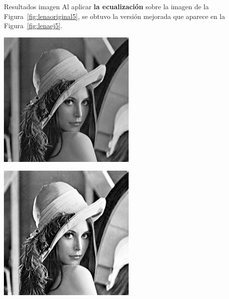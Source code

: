 \documentclass{beamer}
\begin{document}
\begin{frame}[fragile]{Resultados imagen}
	\justifying
	Al aplicar \textcolor{unahurverde}{\textbf{la ecualización}} sobre la imagen de la Figura~\ref{fig:lenaoriginal5}, 
	se obtuvo la versión mejorada que aparece en la Figura~\ref{fig:lenaej5}.
	\vspace{0.5cm}
	
	\centering
	\begin{minipage}{0.45\linewidth}
		\centering
		\includegraphics[width=\linewidth]{../results/lena_original}
		\label{fig:lenaoriginal5}
	\end{minipage}\hfill
	\begin{minipage}{0.45\linewidth}
		\centering
		\includegraphics[width=\linewidth]{../results/lena_ej5}

\end{minipage}
\end{frame}
\end{document}
